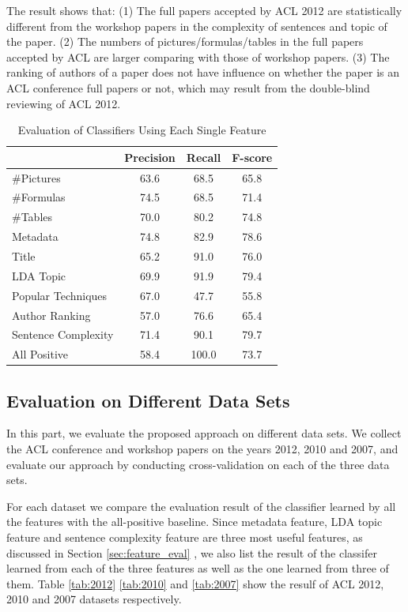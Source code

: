 \documentclass[11pt,letterpaper]{article}
\begin{document}
The result shows that:
(1) The full papers accepted by ACL 2012 are statistically 
different from the workshop papers in the complexity of sentences and topic of the paper.
(2) The numbers of pictures/formulas/tables in the full papers accepted by ACL are larger
comparing with those of workshop papers.
(3) The ranking of authors of a paper does not have influence on whether the paper 
is an ACL conference full papers or not, 
which may result from the double-blind reviewing of ACL 2012. 

\begin{table}
\begin{center}
\begin{tabular}{|p{2cm}|c|c|c|}
\hline 
& \bf Precision & \bf Recall & \bf F-score \\ \hline
\#Pictures & 63.6 & 68.5 & 65.8 \\ \hline
\#Formulas	& 74.5	& 68.5	& 71.4\\ \hline
\#Tables	&70.0 &	80.2	& 74.8\\ \hline
Metadata	& 74.8	& 82.9	& 78.6\\ \hline
Title	& 65.2	& 91.0 &	76.0\\ \hline
LDA Topic &	69.9	&91.9&	79.4\\ \hline
Popular Techniques	& 67.0	& 47.7	&55.8\\ \hline
Author Ranking	& 57.0	& 76.6	& 65.4\\ \hline
Sentence Complexity	& 71.4	& 90.1 &	79.7\\ \hline
All Positive	& 58.4	& 100.0	& 73.7\\\hline
\end{tabular}
\end{center}
\label{tab:feature_eval}
\caption{Evaluation of Classifiers Using Each Single Feature}
\end{table}



\subsection{Evaluation on Different Data Sets}
In this part, we evaluate the proposed approach on different data sets.
We collect the ACL conference and workshop papers on the years 2012, 2010 and 2007,
and evaluate our approach by conducting cross-validation on each of the three data sets.

For each dataset we compare the evaluation result of the classifier learned by all the features with the all-positive baseline.
Since metadata feature, LDA topic feature and sentence complexity feature are three most useful features, as discussed in Section \ref{sec:feature_eval}
, we also list the result of the classifer learned from each of the three features as well as the one learned from three of them. 
Table \ref{tab:2012} \ref{tab:2010} and \ref{tab:2007} show the resulf of ACL 2012, 2010 and 2007 datasets respectively.
\end{document}
